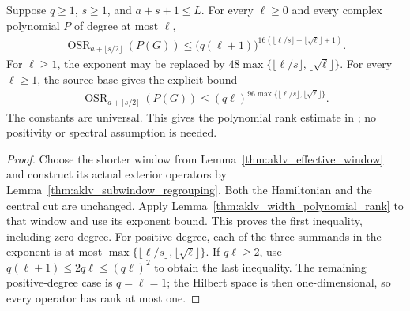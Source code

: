 \begin{theorem}
    \label{thm:aklv_polynomial_rank}
    \leanok
    Suppose $q\ge1$, $s\ge1$, and $a+s+1\le L$.
    For every $\ell\ge0$ and every complex polynomial $P$ of degree at most $\ell$,
    \begin{align*}
        \operatorname{OSR}_{a+\lfloor s/2\rfloor}(P(G))
        \le \bigl(q(\ell+1)\bigr)^{
                16(\lfloor\ell/s\rfloor+\lfloor\sqrt\ell\rfloor+1)}.
    \end{align*}
    For $\ell\ge1$, the exponent may be replaced by
    $48\max\{\lfloor\ell/s\rfloor,\lfloor\sqrt\ell\rfloor\}$.
    For every $\ell\ge1$, the source base gives the explicit bound
    \begin{align*}
        \operatorname{OSR}_{a+\lfloor s/2\rfloor}(P(G))
        \le(q\ell)^{96\max\{\lfloor\ell/s\rfloor,\lfloor\sqrt\ell\rfloor\}}.
    \end{align*}
    The constants are universal. This gives the polynomial rank estimate in
    \cite[Lemma~4.2]{Arad2013AreaLaw}; no positivity or spectral assumption is needed.
\end{theorem}
\begin{proof}
    \leanok
    Choose the shorter window from Lemma~\ref{thm:aklv_effective_window} and
    construct its actual exterior operators by
    Lemma~\ref{thm:aklv_subwindow_regrouping}. Both the Hamiltonian and the
    central cut are unchanged. Apply
    Lemma~\ref{thm:aklv_width_polynomial_rank} to that window and use its
    exponent bound. This proves the first inequality, including zero degree.
    For positive degree, each of the three summands in the exponent is at
    most $\max\{\lfloor\ell/s\rfloor,\lfloor\sqrt\ell\rfloor\}$.
    If $q\ell\ge2$, use $q(\ell+1)\le2q\ell\le(q\ell)^2$ to obtain the
    last inequality. The remaining positive-degree case is $q=\ell=1$;
    the Hilbert space is then one-dimensional, so every operator has rank at most one.
\end{proof}
